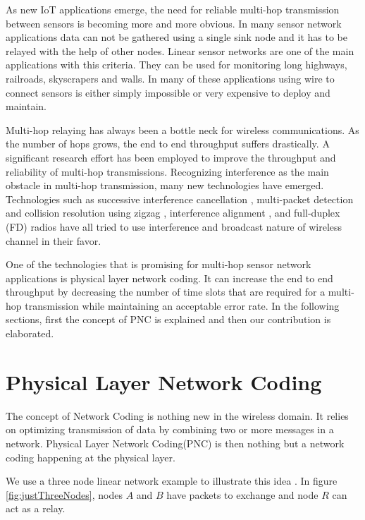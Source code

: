 \label{chapter:multi}

As new IoT applications emerge, the need for reliable multi-hop transmission between sensors is becoming more and more obvious. In many sensor network applications data can not be gathered using a single sink node and it has to be relayed with the help of other nodes. Linear sensor networks are one of the main applications with this criteria. They can be used for monitoring long highways, railroads, skyscrapers and walls. In many of these applications using wire to connect sensors is either simply impossible or very expensive to deploy and maintain.

Multi-hop relaying has always been a bottle neck for wireless communications. As the number of hops grows, the end to end throughput suffers drastically. A significant research effort has been employed to improve the throughput and reliability of multi-hop transmissions. Recognizing interference as the main obstacle in multi-hop transmission, many new technologies have emerged. Technologies such as successive interference cancellation \cite{alvandi2015delay}, multi-packet detection and collision resolution using zigzag \cite{mzig}, interference alignment \cite{4567443, 7218598}, and full-duplex (FD) radios \cite{fullduplex} have all tried to use interference and broadcast nature of wireless channel in their favor.

One of the technologies that is promising for multi-hop sensor network applications is physical layer network coding. It can increase the end to end throughput by decreasing the number of time slots that are required for a multi-hop transmission while maintaining an acceptable error rate. In the following sections, first the concept of PNC is explained and then our contribution is elaborated.

\section{Physical Layer Network Coding}

The concept of Network Coding is nothing new in the wireless domain. It relies on optimizing transmission of data by combining two or more messages in a network. Physical Layer Network Coding(PNC) is then nothing but a network coding happening at the physical layer.

We use a three node linear network example to illustrate this idea \cite{zhang2006hot}. In figure \ref{fig:justThreeNodes}, nodes $A$ and $B$ have packets to exchange and node $R$ can act as a relay.


